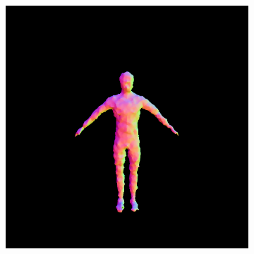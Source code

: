 \begin{figure}[ht]
    \centering
    \begin{subfigure}[b]{0.20\textwidth}
        \centering
        \fontsize{9pt}{7pt}\selectfont{}\vspace{3cm}
        \fontsize{9pt}{7pt}\selectfont{}\vspace{2.85cm}
        \fontsize{9pt}{7pt}\selectfont{}\vspace{1.95cm}
    \end{subfigure}
    \begin{subfigure}[b]{0.20\textwidth}
        \centering
        \includegraphics[width=\textwidth]{etc/a robot made out of plants/fantasia3d_fromMesh/fantasia_coarse_robot_0_part2.png}

\end{subfigure}
\end{figure}
